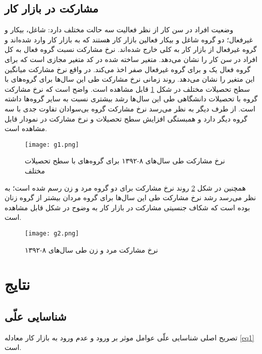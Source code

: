 \documentclass[12pt, a4paper]{article}
\begin{document}
\subsection{مشارکت در بازار کار}
وضعیت افراد در سن کار از نظر فعالیت سه حالت مختلف دارد: شاغل، بیکار و غیرفعال؛ دو گروه شاغل و بیکار فعالین بازار کار هستند که به بازار کار وارد شده‌اند و گروه غیرفعال از بازار کار به کلی خارج شده‌اند. نرخ مشارکت نسبت گروه فعال به کل افراد در سن کار را نشان می‌دهد. متغیر 
ساخته شده در کد متغیر مجازی 
است که برای گروه فعال یک و برای گروه غیرفعال صفر اخذ می‌کند. در واقع نرخ مشارکت میانگین این متغیر را نشان می‌دهد.
 روند زمانی نرخ مشارکت طی این سال‌ها برای گروه‌های با سطح تحصیلات مختلف در شکل
 \ref{fig_edu}
 قابل مشاهده است. واضح است که نرخ مشارکت گروه‌ با تحصیلات دانشگاهی طی این سال‌ها رشد بیشتری نسبت به سایر گروه‌ها داشته است. از طرف دیگر به نظر می‌رسد نرخ مشارکت گروه بی‌سوادان تفاوت جدی با سه گروه دیگر دارد و همبستگی افزایش سطح تحصیلات و نرخ مشارکت در نمودار قابل مشاهده است.
\begin{figure}
		\centering
	\texttt{[image: g1.png]}
	\caption{نرخ مشارکت طی سال‌های ۸-۱۳۹۲ برای گروه‌های با سطح تحصیلات مختلف}\label{fig_edu}
\end{figure}
	همچنین در شکل
	\ref{fig_sex}
	روند نرخ مشارکت برای دو گروه مرد و زن رسم شده است؛ به نظر می‌رسد رشد نرخ مشارکت  طی این سال‌ها برای گروه مردان بیشتر از گروه زنان بوده است که شکاف جنسیتی مشارکت در بازار کار به وضوح در شکل قابل مشاهده است.
\begin{figure}
	\centering
	\texttt{[image: g2.png]}
	\caption{نرخ مشارکت مرد و زن طی سال‌های ۸-۱۳۹۲}\label{fig_sex}
\end{figure}
\newpage \clearpage
\section{نتایج}
\subsection{شناسایی علّی}
تصریح اصلی شناسایی علّی عوامل موثر بر ورود و عدم ورود به بازار کار معادله 
\ref{eq1}
 است.
\end{document}
